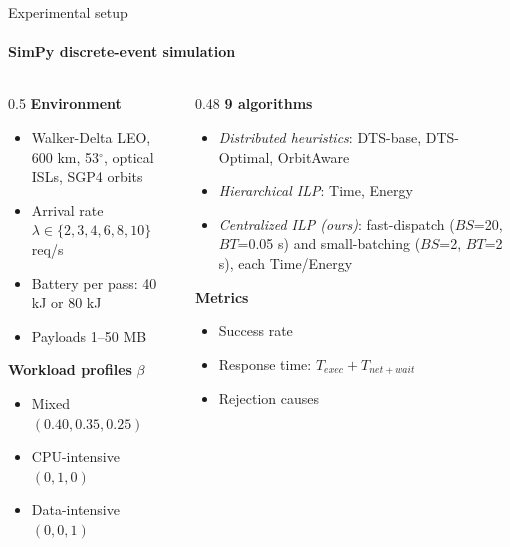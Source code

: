 \documentclass{beamer}
\newcommand{\lam}{\lambda}
\newcommand{\bs}{\mathit{BS}}
\newcommand{\bt}{\mathit{BT}}
\begin{document}
\begin{frame}{Experimental setup}
\framesubtitle{SimPy discrete-event simulation}
\small
\begin{columns}[T]
\begin{column}{0.5\textwidth}
\textbf{Environment}
\begin{itemize}\setlength\itemsep{2pt}
  \item Walker-Delta LEO, 600 km, 53$^\circ$, optical ISLs, SGP4 orbits
  \item Arrival rate $\lam\in\{2,3,4,6,8,10\}$ req/s
  \item Battery per pass: 40 kJ or 80 kJ
  \item Payloads 1--50 MB
\end{itemize}
\textbf{Workload profiles} $\beta$
\begin{itemize}\setlength\itemsep{2pt}
  \item Mixed $(0.40,0.35,0.25)$
  \item CPU-intensive $(0,1,0)$
  \item Data-intensive $(0,0,1)$
\end{itemize}
\end{column}
\begin{column}{0.48\textwidth}
\textbf{9 algorithms}
\begin{itemize}\setlength\itemsep{2pt}
  \item \emph{Distributed heuristics}: DTS-base, DTS-Optimal, OrbitAware
  \item \emph{Hierarchical ILP}: Time, Energy
  \item \emph{Centralized ILP (ours)}: fast-dispatch ($\bs$=20, $\bt$=0.05 s) and small-batching ($\bs$=2, $\bt$=2 s), each Time/Energy
\end{itemize}
\textbf{Metrics}
\begin{itemize}\setlength\itemsep{2pt}
  \item Success rate
  \item Response time: $T_{exec}+T_{net+wait}$
  \item Rejection causes
\end{itemize}
\end{column}
\end{columns}
\end{frame}
\end{document}
